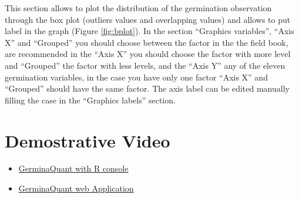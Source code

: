 \documentclass[]{book}
\begin{document}
This section allows to plot the distribution of the germination
observation through the box plot (outliers values and overlapping
values) and allows to put label in the graph (Figure \ref{fig:bplot}).
In the section ``Graphics variables'', ``Axis X'' and ``Grouped'' you
should choose between the factor in the the field book, are recommended
in the ``Axis X'' you should choose the factor with more level and
``Grouped'' the factor with less levels, and the ``Axis Y'' any of the
eleven germination variables, in the case you have only one factor
``Axis X'' and ``Grouped'' should have the same factor. The axis label
can be edited manually filling the case in the ``Graphics labels''
section.

\chapter{Demostrative Video}\label{demostrative-video}

\begin{itemize}
\item
  \href{https://drive.google.com/file/d/0B4Ou4jPpNgJbeHVoeG54dGo3bm8/view}{GerminaQuant
  with R console}
\item
  \href{https://drive.google.com/file/d/0B4Ou4jPpNgJbaVJMUFUwc2Z6QnM/view}{GerminaQuant
  web Application}
\end{itemize}


\end{document}
